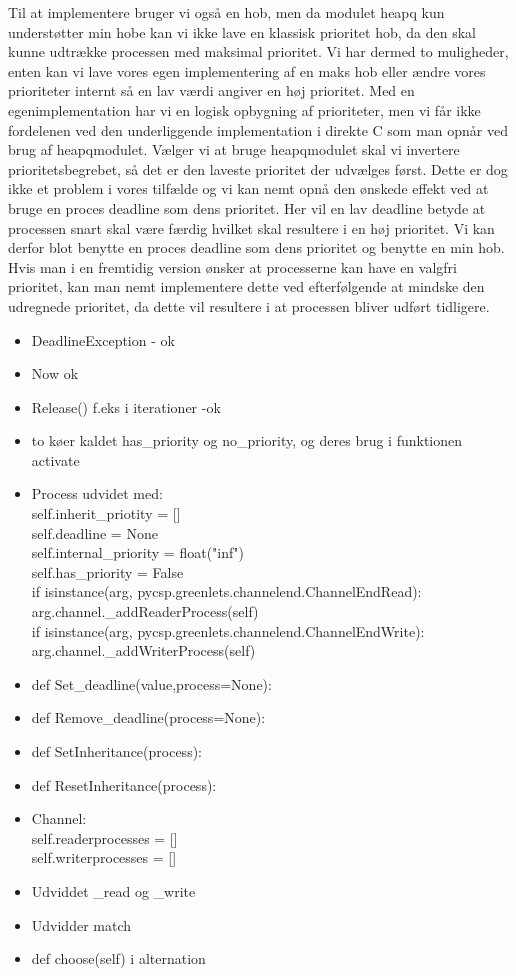 Til at implementere  bruger vi også en hob, men da modulet heapq  kun understøtter min hobe kan vi ikke lave en klassisk prioritet hob, da den skal kunne udtrække processen med maksimal prioritet. Vi har dermed to muligheder, enten kan vi lave vores egen implementering af en maks hob eller ændre vores prioriteter internt så en lav værdi angiver en høj prioritet. Med en egenimplementation har vi en  logisk opbygning af prioriteter, men vi får ikke fordelenen ved den underliggende implementation i direkte C som man opnår ved brug af heapqmodulet. Vælger vi at bruge heapqmodulet skal vi invertere prioritetsbegrebet, så det er den laveste prioritet der udvælges først. Dette er dog ikke et problem  i vores tilfælde og vi kan nemt opnå den ønskede effekt ved at bruge en proces deadline som dens prioritet. Her vil en lav deadline betyde at processen snart skal være færdig hvilket skal resultere i en høj prioritet.
Vi kan derfor blot benytte en proces deadline som dens prioritet og benytte en min hob. Hvis man i en fremtidig version ønsker at processerne kan have en valgfri prioritet, kan man nemt implementere dette ved efterfølgende at mindske den udregnede prioritet, da dette vil resultere i at processen bliver udført tidligere.


\begin{itemize}
\tightlist
\item DeadlineException - ok
\item Now ok
\item Release() f.eks i iterationer -ok
\item to køer kaldet has\_priority og no\_priority, og deres brug i funktionen activate
\item Process udvidet med: \\self.inherit\_priotity = []     \\
        self.deadline = None\\
        self.internal\_priority = float("inf")\\
        self.has\_priority = False\\
            if isinstance(arg, pycsp.greenlets.channelend.ChannelEndRead):\\
                arg.channel.\_addReaderProcess(self)\\
            if isinstance(arg, pycsp.greenlets.channelend.ChannelEndWrite):\\
                arg.channel.\_addWriterProcess(self)
\item def Set\_deadline(value,process=None):
\item def Remove\_deadline(process=None):
\item def SetInheritance(process):
\item def ResetInheritance(process):
\item Channel:\\
        self.readerprocesses = []\\
        self.writerprocesses = []

\item Udviddet \_read og \_write
\item Udvidder match
\item     def choose(self) i alternation


\end{itemize}
